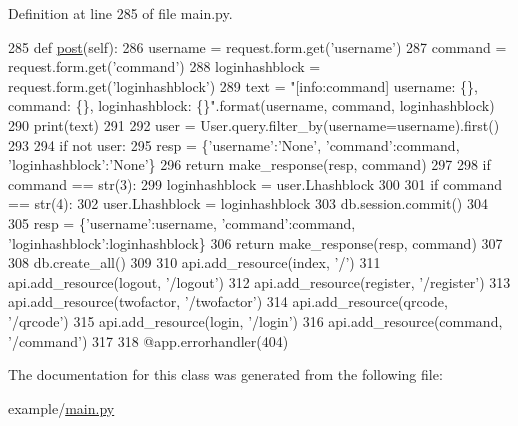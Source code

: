 Definition at line 285 of file main.\+py.


\begin{DoxyCode}
285     \textcolor{keyword}{def }\hyperlink{classmain_1_1command_aad57d3ca75e00b96364b4dd9971f8d34}{post}(self):
286         username = request.form.get(\textcolor{stringliteral}{'username'})
287         command = request.form.get(\textcolor{stringliteral}{'command'})
288         loginhashblock = request.form.get(\textcolor{stringliteral}{'loginhashblock'})
289         text = \textcolor{stringliteral}{"[info:command] username: \{\}, command: \{\}, loginhashblock: \{\}"}.format(username, command, 
      loginhashblock)
290         print(text)
291 
292         user = User.query.filter\_by(username=username).first()
293 
294         \textcolor{keywordflow}{if} \textcolor{keywordflow}{not} user:
295             resp = \{\textcolor{stringliteral}{'username'}:\textcolor{stringliteral}{'None'}, \textcolor{stringliteral}{'command'}:command, \textcolor{stringliteral}{'loginhashblock'}:\textcolor{stringliteral}{'None'}\}
296             \textcolor{keywordflow}{return} make\_response(resp, command)
297 
298         \textcolor{keywordflow}{if} command == str(3):
299             loginhashblock = user.Lhashblock
300 
301         \textcolor{keywordflow}{if} command == str(4):
302             user.Lhashblock = loginhashblock
303             db.session.commit()
304 
305         resp = \{\textcolor{stringliteral}{'username'}:username, \textcolor{stringliteral}{'command'}:command, \textcolor{stringliteral}{'loginhashblock'}:loginhashblock\}
306         \textcolor{keywordflow}{return} make\_response(resp, command)
307 
308 db.create\_all()
309 
310 api.add\_resource(index, \textcolor{stringliteral}{'/'})
311 api.add\_resource(logout, \textcolor{stringliteral}{'/logout'})
312 api.add\_resource(register, \textcolor{stringliteral}{'/register'})
313 api.add\_resource(twofactor, \textcolor{stringliteral}{'/twofactor'})
314 api.add\_resource(qrcode, \textcolor{stringliteral}{'/qrcode'})
315 api.add\_resource(login, \textcolor{stringliteral}{'/login'})
316 api.add\_resource(command, \textcolor{stringliteral}{'/command'})
317 
318 @app.errorhandler(404)
\end{DoxyCode}


The documentation for this class was generated from the following file\+:\begin{DoxyCompactItemize}
\item 
example/\hyperlink{main_8py}{main.\+py}\end{DoxyCompactItemize}
